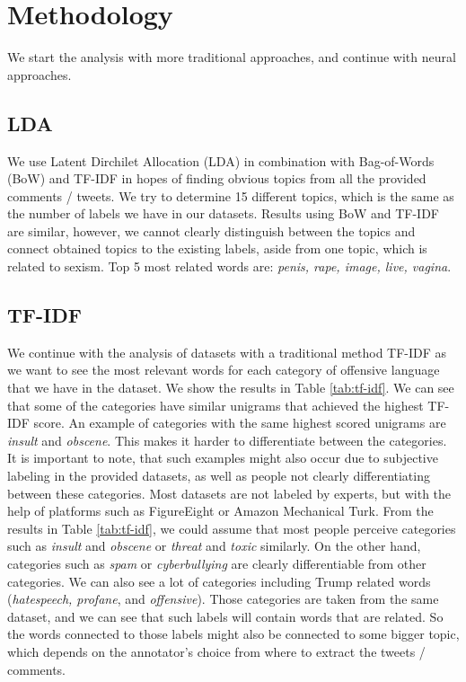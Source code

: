 \documentclass[fleqn,moreauthors,10pt]{ds_report}
\begin{document}
\section*{Methodology}
\label{sec:metho}
We start the analysis with more traditional approaches, and continue with neural approaches.

\subsection*{LDA}
We use Latent Dirchilet Allocation (LDA) in combination with Bag-of-Words (BoW) and TF-IDF in hopes of finding obvious topics from all the provided comments / tweets. We try to determine 15 different topics, which is the same as the number of labels we have in our datasets. Results using BoW and TF-IDF are similar, however, we cannot clearly distinguish between the topics and connect obtained topics to the existing labels, aside from one topic, which is related to sexism. Top 5 most related words are: \textit{penis, rape, image, live, vagina}.

\subsection*{TF-IDF}
We continue with the analysis of datasets with a traditional method TF-IDF as we want to see the most relevant words for each category of offensive language that we have in the dataset. We show the results in Table \ref{tab:tf-idf}. We can see that some of the categories have similar unigrams that achieved the highest TF-IDF score. An example of categories with the same highest scored unigrams are \textit{insult} and \textit{obscene}. This makes it harder to differentiate between the categories. It is important to note, that such examples might also occur due to subjective labeling in the provided datasets, as well as people not clearly differentiating between these categories. Most datasets are not labeled by experts, but with the help of platforms such as FigureEight or Amazon Mechanical Turk. From the results in Table \ref{tab:tf-idf}, we could assume that most people perceive categories such as \textit{insult} and \textit{obscene} or \textit{threat} and \textit{toxic} similarly. On the other hand, categories such as \textit{spam} or \textit{cyberbullying} are clearly differentiable from other categories. We can also see a lot of categories including Trump related words (\textit{hatespeech, profane}, and \textit{offensive}). Those categories are taken from the same dataset, and we can see that such labels will contain words that are related. So the words connected to those labels might also be connected to some bigger topic, which depends on the annotator's choice from where to extract the tweets / comments.
\end{document}
